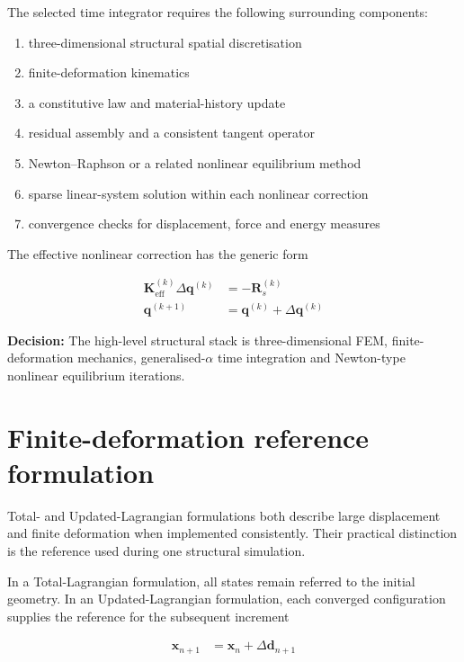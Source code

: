 \documentclass[11pt,a4paper]{article}
\newcommand{\decision}[1]{\textbf{Decision:} #1}
\begin{document}
The selected time integrator requires the following surrounding components:

\begin{enumerate}[label=\arabic*.]
  \item three-dimensional structural spatial discretisation
  \item finite-deformation kinematics
  \item a constitutive law and material-history update
  \item residual assembly and a consistent tangent operator
  \item Newton--Raphson or a related nonlinear equilibrium method
  \item sparse linear-system solution within each nonlinear correction
  \item convergence checks for displacement, force and energy measures
\end{enumerate}

The effective nonlinear correction has the generic form

\begin{align}
\bm{K}_{\mathrm{eff}}^{(k)}\Delta\bm{q}^{(k)}
&=
-\bm{R}_{s}^{(k)}
\label{eq:newton-correction}
\\
\bm{q}^{(k+1)}
&=
\bm{q}^{(k)}+\Delta\bm{q}^{(k)}
\label{eq:newton-update}
\end{align}

\decision{The high-level structural stack is three-dimensional FEM, finite-deformation mechanics, generalised-\(\alpha\) time integration and Newton-type nonlinear equilibrium iterations.}

\section{Finite-deformation reference formulation}
\label{sec:finite-deformation-reference}

Total- and Updated-Lagrangian formulations both describe large displacement and finite deformation when implemented consistently. Their practical distinction is the reference used during one structural simulation.

In a Total-Lagrangian formulation, all states remain referred to the initial geometry. In an Updated-Lagrangian formulation, each converged configuration supplies the reference for the subsequent increment

\begin{align}
\bm{x}_{n+1}
&=
\bm{x}_{n}+\Delta\bm{d}_{n+1}
\label{eq:updated-lagrangian-motion}
\end{align}
\end{document}
